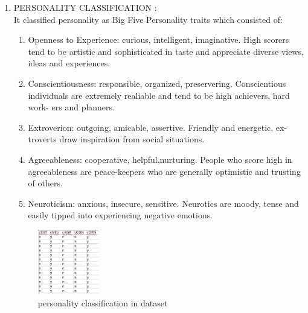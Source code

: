 \documentclass[a4paper, 12pt, onepage]{article}
\begin{document}
\begin{enumerate}
\begin{enumerate}
\begin{figure}[h!]
	\end{figure}
		\item PERSONALITY CLASSIFICATION : \\
			It classified personality as Big Five Personality traits which consisted of:\\
		\begin{enumerate}
		\item Openness to Experience:
			curious, intelligent, imaginative. High scorers
			tend to be artistic and sophisticated in taste and appreciate diverse views,
			ideas and experiences.
		\item Conscientiousness:
			responsible, organized, preservering. Conscientious
			individuals are extremely realiable and tend to be high achievers, hard work-
			ers and planners.
		\item Extroverion:
			outgoing, amicable, assertive. Friendly and energetic, ex-
			troverts draw inspiration from social situations.
		\item Agreeableness:
		cooperative, helpful,nurturing. People who score high in
		agreeableness are peace-keepers who are generally optimistic and trusting of
		others.
		\item Neuroticism:
			anxious, insecure, sensitive. Neurotics are moody, tense and
			easily tipped into experiencing negative emotions.
		\end{enumerate}
      \begin{figure}[h!]
	      \centering
	      \includegraphics[width=100px]{personality.png}
		\caption{personality classification in dataset}
	\end{figure}
		\end{enumerate}


\end{enumerate}
\end{document}
